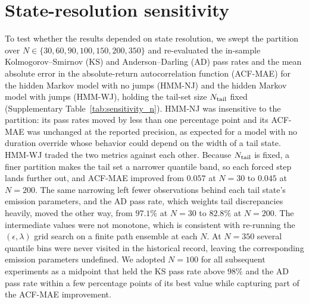 \section{State-resolution sensitivity}
\label{sec:supp-sensitivity}

To test whether the results depended on state resolution, we swept the
partition over $N \in \{30, 60, 90, 100, 150, 200, 350\}$ and
re-evaluated the in-sample Kolmogorov--Smirnov (KS) and
Anderson--Darling (AD) pass rates and the mean absolute error in the
absolute-return autocorrelation function (ACF-MAE) for the hidden
Markov model with no jumps (HMM-NJ) and the hidden Markov model with
jumps (HMM-WJ), holding the tail-set size $N_{\rm tail}$ fixed
(Supplementary Table~\ref{tab:sensitivity_n}). HMM-NJ was insensitive to the
partition: its pass rates moved by less than one percentage point and
its ACF-MAE was unchanged at the reported precision, as expected for a
model with no duration override whose behavior could depend on the
width of a tail state. HMM-WJ traded the two metrics against each other. Because
$N_{\rm tail}$ is fixed, a finer partition makes the tail set a
narrower quantile band, so each forced step lands further out, and
ACF-MAE improved from $0.057$ at $N = 30$ to $0.045$ at $N = 200$. The
same narrowing left fewer observations behind each tail state's
emission parameters, and the AD pass rate, which weights tail
discrepancies heavily, moved the other way, from $97.1\%$ at $N = 30$
to $82.8\%$ at $N = 200$. The intermediate values were not monotone,
which is consistent with re-running the $(\epsilon, \lambda)$ grid
search on a finite path ensemble at each $N$. At $N = 350$ several
quantile bins were never visited in the historical record, leaving the
corresponding emission parameters undefined. We adopted $N = 100$ for
all subsequent experiments as a midpoint that held the KS pass rate
above $98\%$ and the AD pass rate within a few percentage points of its
best value while capturing part of the ACF-MAE improvement.

